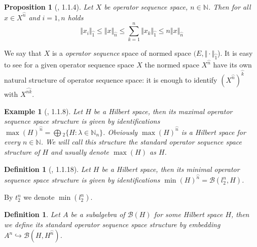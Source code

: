 \documentclass[12pt]{article}
\newtheorem{proposition}[theorem]{Proposition}
\newtheorem{definition}[theorem]{Definition}
\newtheorem{example}[theorem]{Example}
\begin{document}
\begin{proposition}[\cite{LamOpFolgen}, 1.1.4]\label{PrNormVsSQNorm} Let $X$ be
operator sequence space, $n\in\mathbb{N}$. Then for all $x\in X^{\wideparen{n}}$
and $i=1,n$ holds
$$
\Vert x_i\Vert_{\wideparen{1}}
\leq\Vert x\Vert_{\wideparen{n}}
\leq\sum\limits_{k=1}^n\Vert x_k\Vert_{\wideparen{1}}
\leq n\Vert x\Vert_{\wideparen{n}}
$$
\end{proposition}


We say that $X$ is a \textit{operator sequence} space of normed space $(E, \Vert
\cdot \Vert_{\wideparen{1}}$). It is easy to see for a given operator sequence
space $X$ the normed space $X^{\wideparen{n}}$ have its own natural structure of
operator sequence space: it is enough to identify
${(X^{\wideparen{n}})}^{\wideparen{k}}$ with $X^{\wideparen{nk}}$.

\begin{example}[\cite{LamOpFolgen}, 1.1.8]\label{ExHilSQ} Let $H$ be a Hilbert
space, then its maximal operator sequence space structure is given by
identifications
${\max(H)}^{\wideparen{n}}=\bigoplus{}_2 \{H:\lambda\in\mathbb{N}_n \}$. 
Obviously
${\max(H)}^{\wideparen{n}}$ is a Hilbert space for every $n\in\mathbb{N}$. 
We will call this structure the standard operator sequence space structure 
of $H$ and usually denote $\max(H)$ as $H$.
\end{example}

\begin{definition}[\cite{LamOpFolgen}, 1.1.18]\label{ExT2nSQ} Let $H$ be a
Hilbert space, then its minimal operator sequence space structure is given by
identifications ${\min(H)}^{\wideparen{n}} = \mathcal{B}(l_2^n,H)$. 
\end{definition}

By $t_2^n$ we denote $\min(l_2^n)$.

\begin{definition}\label{DefOpSubAlgSQ} Let $A$ be a subalgebra of
$\mathcal{B}(H)$ for some Hilbert space $H$, then we define its standard
operator sequence space structure by embedding $A^n\hookrightarrow
\mathcal{B}(H,H^{\wideparen{n}})$.
\end{definition}
\end{document}
